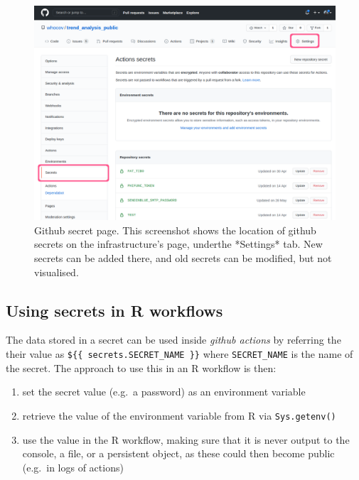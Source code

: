 \documentclass[]{book}
\providecommand{\tightlist}{%
  \setlength{\itemsep}{0pt}\setlength{\parskip}{0pt}}
\begin{document}
\begin{figure}

{\centering \includegraphics[width=1\linewidth]{images/secrets} 

}

\caption{Github secret page. This screenshot shows the location of github secrets on the infrastructure's page, underthe *Settings* tab. New secrets can be added there, and old secrets can be modified, but not visualised.}\label{fig:secrets}
\end{figure}

\hypertarget{using-secrets-in-r-workflows}{%
\subsection{Using secrets in R workflows}\label{using-secrets-in-r-workflows}}

The data stored in a secret can be used inside \emph{github actions} by referring the
their value as \texttt{\$\{\{\ secrets.SECRET\_NAME\ \}\}} where \texttt{SECRET\_NAME} is the name of
the secret. The approach to use this in an R workflow is then:

\begin{enumerate}
\def\labelenumi{\arabic{enumi}.}
\tightlist
\item
  set the secret value (e.g.~a password) as an environment variable
\item
  retrieve the value of the environment variable from R via \texttt{Sys.getenv()}
\item
  use the value in the R workflow, making sure that it is never output to the
  console, a file, or a persistent object, as these could then become public
  (e.g.~in logs of actions)
\end{enumerate}
\end{document}
